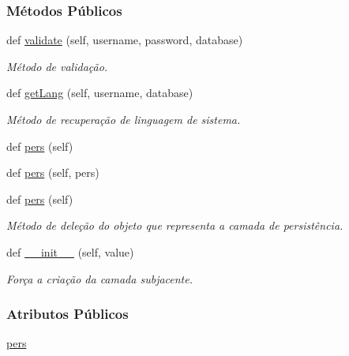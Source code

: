 \subsubsection*{Métodos Públicos}
\begin{DoxyCompactItemize}
\item 
def \hyperlink{classLogin_1_1LoginUnit_1_1IfBusLogin_a6945b614a0b0f5ee03c61bcd3982c821}{validate} (self, username, password, database)
\begin{DoxyCompactList}\small\item\em Método de validação. \end{DoxyCompactList}\item 
def \hyperlink{classLogin_1_1LoginUnit_1_1IfBusLogin_a16592b98a3bf9ab48147eed8b6657874}{get\+Lang} (self, username, database)
\begin{DoxyCompactList}\small\item\em Método de recuperação de linguagem de sistema. \end{DoxyCompactList}\item 
def \hyperlink{classLogin_1_1LoginUnit_1_1IfBusLogin_ac72dec0df502cc712d090ef55e2beb56}{pers} (self)
\item 
def \hyperlink{classLogin_1_1LoginUnit_1_1IfBusLogin_ae2880a2f2803cd219bda47f32892e7ed}{pers} (self, pers)
\item 
def \hyperlink{classLogin_1_1LoginUnit_1_1IfBusLogin_ac72dec0df502cc712d090ef55e2beb56}{pers} (self)
\begin{DoxyCompactList}\small\item\em Método de deleção do objeto que representa a camada de persistência. \end{DoxyCompactList}\item 
def \hyperlink{classLogin_1_1LoginUnit_1_1IfBusLogin_a00b6c0e1640297ed24c83bfe1af6c5a5}{\+\_\+\+\_\+init\+\_\+\+\_\+} (self, value)
\begin{DoxyCompactList}\small\item\em Força a criação da camada subjacente. \end{DoxyCompactList}\end{DoxyCompactItemize}
\subsubsection*{Atributos Públicos}
\begin{DoxyCompactItemize}
\item 
\hyperlink{classLogin_1_1LoginUnit_1_1IfBusLogin_a53b8075436052b94282021c84a2c3211}{pers}
\end{DoxyCompactItemize}


